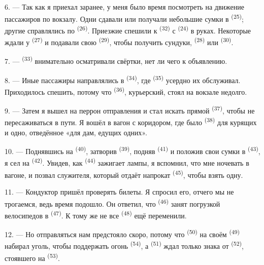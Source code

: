 6. --- Так как я приехал заранее, у меня было время посмотреть на движение
пассажиров по вокзалу. Одни сдавали или получали небольшие сумки в
 \textsuperscript{(25)}; другие справлялись по
 \textsuperscript{(26)}. Приезжие спешили к 
\textsuperscript{(32)} с  \textsuperscript{(24)} в руках. Некоторые
ждали у  \textsuperscript{(27)} и подавали свою
 \textsuperscript{(29)}, чтобы получить сундуки, 
\textsuperscript{(28)} или  \textsuperscript{(30)}.

7. ---  \textsuperscript{(33)} внимательно осматривали
свёртки, нет ли чего к объявлению.

8. --- Иные пассажиры направлялись в  \textsuperscript{(34)}, где
 \textsuperscript{(35)} усердно их обслуживал. Приходилось
спешить, потому что  \textsuperscript{(36)}, курьерский, стоял на
вокзале недолго.

9. --- Затем я вышел на перрон отправления и стал искать прямой
 \textsuperscript{(37)}, чтобы не пересаживаться в пути. Я вошёл в
вагон с коридором, где было  \textsuperscript{(38)} для курящих и
одно, отведённое «для дам, едущих одних».

\VUsaut{3.0mm}

10. --- Поднявшись на  \textsuperscript{(40)}, затворив
 \textsuperscript{(39)}, подняв  \textsuperscript{(41)} и
положив свои сумки в  \textsuperscript{(43)}, я сел на
 \textsuperscript{(42)}. Увидев, как  \textsuperscript{(44)}
зажигает лампы, я вспомнил, что мне ночевать в вагоне, и позвал служителя,
который отдаёт напрокат  \textsuperscript{(45)}, чтобы взять одну.

11. --- Кондуктор пришёл проверять билеты. Я спросил его, отчего мы не
трогаемся, ведь время подошло. Он ответил, что 
\textsuperscript{(46)} занят погрузкой велосипедов в 
\textsuperscript{(47)}. К тому же не все  \textsuperscript{(48)} ещё
переменили.

12. --- Но отправляться нам предстояло скоро, потому что 
\textsuperscript{(50)} на своём  \textsuperscript{(49)} набирал уголь,
чтобы поддержать огонь  \textsuperscript{(54)}, а
 \textsuperscript{(51)} ждал только знака от  \textsuperscript{(52)}, стоявшего на 
\textsuperscript{(53)}.

